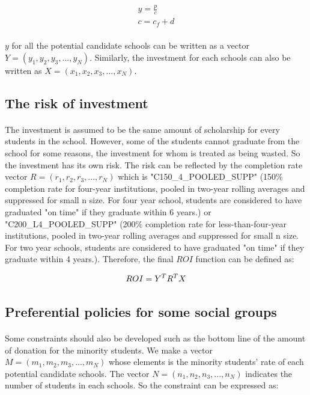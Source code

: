 \documentclass[11pt]{article}
\begin{document}
\begin{align}
y=\frac{p}{c}\\
c=c_f+d
\end{align}

\paragraph{} $y$ for all the potential candidate schools can be written as a vector $Y=(y_1, y_2, y_3, ..., y_N)$. Similarly, the investment for each schools can also be written as $X=(x_1, x_2, x_3, ..., x_N)$.

\subsection{The risk of investment}
\paragraph{} The investment is assumed to be the same amount of scholarship for every students in the school. However, some of the students cannot graduate from  the school for some reasons, the investment for whom is treated as being wasted. So the investment has its own risk. The risk can be reflected by the completion rate vector $R=(r_1, r_2, r_3, ..., r_N)$ which is "C150\_4\_POOLED\_SUPP" (150\% completion rate for four-year institutions, pooled in two-year rolling averages and suppressed for small n size.  For four year school, students are considered to have graduated "on time" if they graduate within 6 years.) or "C200\_L4\_POOLED\_SUPP" (200\% completion rate for less-than-four-year institutions, pooled in two-year rolling averages and suppressed for small n size.  For two year schools, students are considered to have graduated "on time" if they graduate within 4 years.). Therefore, the final $ROI$ function can be defined as:

\begin{align}
ROI=Y^T\*R^T\*X
\end{align}

\subsection{Preferential policies for some social groups}  
\paragraph{} Some constraints should also be developed such as the bottom line of the amount of donation for the minority students. We make a vector $M=(m_1, m_2, m_3, ..., m_N)$ whose elements is the minority students' rate of each potential candidate schools. The vector $N=(n_1, n_2, n_3, ..., n_N)$ indicates the number of students in each schools. So the constraint can be expressed as:
 
\end{document}
